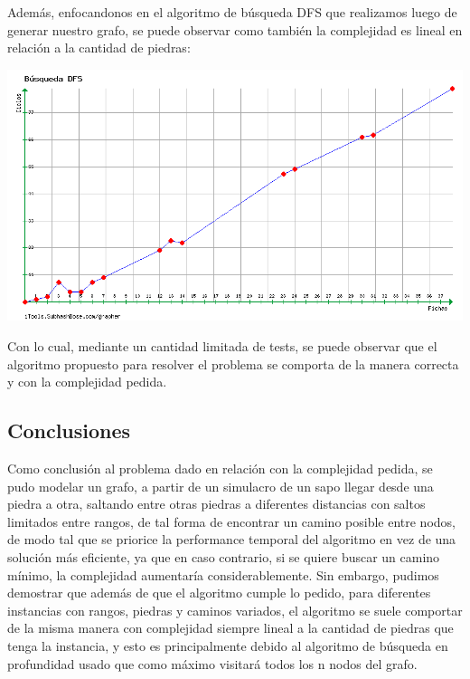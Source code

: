 Además, enfocandonos en el algoritmo de búsqueda DFS que realizamos luego de generar nuestro grafo, se puede observar como también la complejidad es lineal en relación a la cantidad de piedras:
\begin {center}
\includegraphics[width=15cm]{./graficos/grafico_ej3_1.png}
\end {center} 

Con lo cual, mediante un cantidad limitada de tests, se puede observar que el algoritmo propuesto para resolver el problema se comporta de la manera correcta y con la complejidad pedida.

\subsection{Conclusiones}
Como conclusión al problema dado en relación con la complejidad pedida, se pudo modelar un grafo, a partir de un simulacro de un sapo llegar desde una piedra a otra, saltando entre otras piedras a diferentes distancias con saltos limitados entre rangos, de tal forma de encontrar un camino posible entre nodos, de modo tal que se priorice la performance temporal del algoritmo en vez de una solución más eficiente, ya que en caso contrario, si se quiere buscar un camino mínimo, la complejidad aumentaría considerablemente. Sin embargo, pudimos demostrar que además de que el algoritmo cumple lo pedido, para diferentes instancias con rangos, piedras y caminos variados, el algoritmo se suele comportar de la misma manera con complejidad siempre lineal a la cantidad de piedras que tenga la instancia, y esto es principalmente debido al algoritmo de búsqueda en profundidad usado que como máximo visitará todos los n nodos del grafo. 
